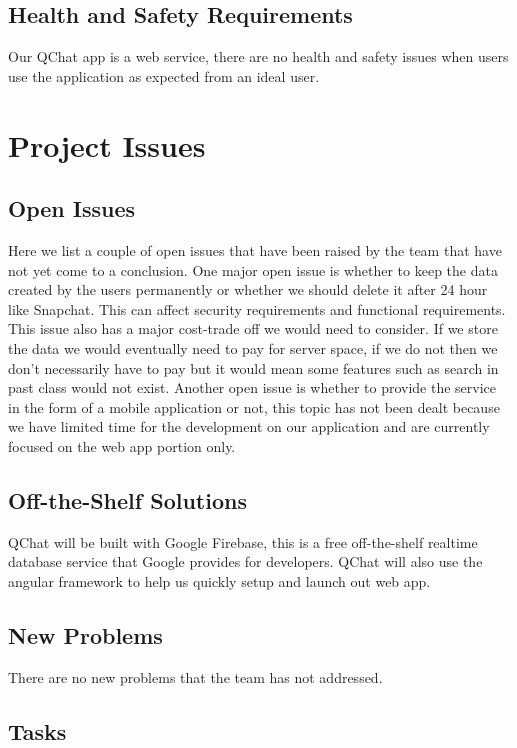 \documentclass[12pt, titlepage]{article}
\begin{document}
\subsection{Health and Safety Requirements}
Our QChat app is a web service, there are no health and safety issues when users use the application as expected from an ideal user.  

\section{Project Issues}

\subsection{Open Issues}
Here we list a couple of open issues that have been raised by the team that have not yet come to a conclusion. One major open issue is whether to keep the data created by the users permanently or whether we should delete it after 24 hour like Snapchat. This can affect security requirements and functional requirements. This issue also has a major cost-trade off we would need to consider. If we store the data we would eventually need to pay for server space, if we do not then we don't necessarily have to pay but it would mean some features such as search in past class would not exist. Another open issue is whether to provide the service in the form of a mobile application or not, this topic has not been dealt because we have limited time for the development on our application and are currently focused on the web app portion only.

\subsection{Off-the-Shelf Solutions}
QChat will be built with Google Firebase, this is a free off-the-shelf realtime database service that Google provides for developers. QChat will also use the angular framework to help us quickly setup and launch out web app.

\subsection{New Problems}
There are no new problems that the team has not addressed.

\subsection{Tasks}
\end{document}
